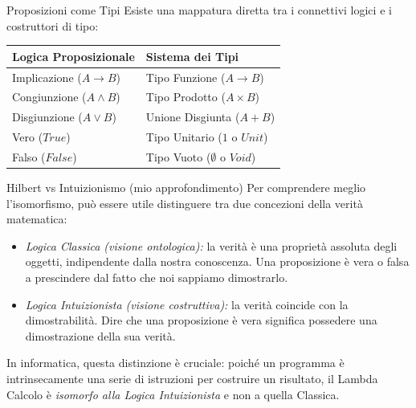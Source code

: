 \documentclass[a4paper,11pt]{report}
\begin{document}
\begin{defframe}{Proposizioni come Tipi}{}
    Esiste una mappatura diretta tra i connettivi logici e i costruttori di tipo:
    
    \begin{center}
    \begin{tabular}{|l|l|}
        \hline
        \textbf{Logica Proposizionale} & \textbf{Sistema dei Tipi} \\
        \hline
        Implicazione ($A \to B$) & Tipo Funzione ($A \to B$) \\
        Congiunzione ($A \wedge B$) & Tipo Prodotto ($A \times B$) \\
        Disgiunzione ($A \vee B$) & Unione Disgiunta ($A + B$) \\
        Vero ($True$) & Tipo Unitario ($1$ o $Unit$) \\
        Falso ($False$) & Tipo Vuoto ($\emptyset$ o $Void$) \\
        \hline
    \end{tabular}
    \end{center}
\end{defframe}


\begin{gframe}{Hilbert vs Intuizionismo (mio approfondimento)}
Per comprendere meglio l'isomorfismo, può essere utile distinguere tra due concezioni della verità matematica:
\begin{itemize}
    \item \textit{Logica Classica (visione ontologica):} la verità è una proprietà assoluta degli oggetti, indipendente dalla nostra conoscenza. Una proposizione è vera o falsa a prescindere dal fatto che noi sappiamo dimostrarlo.
    \item \textit{Logica Intuizionista (visione costruttiva):} la verità coincide con la dimostrabilità. Dire che una proposizione è vera significa possedere una dimostrazione della sua verità.
\end{itemize}

In informatica, questa distinzione è cruciale: poiché un programma è intrinsecamente una serie di istruzioni per costruire un risultato, il Lambda Calcolo è \textit{isomorfo alla Logica Intuizionista} e non a quella Classica.

\end{gframe}
\end{document}
